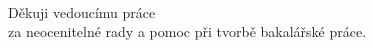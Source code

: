 \thispagestyle{empty}
~
\vfill

\begin{flushright}
    Děkuji vedoucímu práce \ZT{\vedouciDAT}\\ 
    za neocenitelné rady a pomoc při tvorbě bakalářské práce.
\end{flushright}

\cleardoublepage